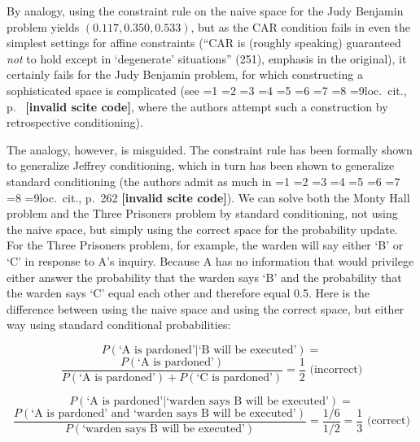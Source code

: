 \documentclass[12pt]{article}
\newcommand{\qnull}[1]{`#1'}
\newcommand{\qeins}[1]{``#1''}
\newcommand{\qzwei}[1]{`#1'}
\newif\ifNumericalOrYear
\newcommand{\PageP}{p.~}
\newcommand{\PageP}{}
\newcommand{\scite}[3]{\ifnum#1=1\ifNumericalOrYear\citep{#2}\else\citeyearpar{#2}\fi\else
\ifnum#1=2\ifNumericalOrYear\citep[#3]{#2}\else\citep[{\PageP}#3]{#2}\fi\else
\ifnum#1=3\ifNumericalOrYear(\citet[#3]{#2})\else\citep[{\PageP}#3]{#2}\fi\else
\ifnum#1=4\ifNumericalOrYear\citet{#2}\else\citet{#2}\fi\else
\ifnum#1=5\ifNumericalOrYear(\citet{#2})\else\citep{#2}\fi\else
\ifnum#1=6\ifNumericalOrYear(\citet[#3]{#2})\else\citep[{\PageP}#3]{#2}\fi\else
\ifnum#1=7\ifNumericalOrYear\citep{#2}\else\citealp{#2}\fi\else
\ifnum#1=8\ifNumericalOrYear\citep[#3]{#2}\else\citealp[{\PageP}#3]{#2}\fi\else
\ifnum#1=9\ifNumericalOrYear\citep[#3]{#2}\else{}loc.\ cit., {\PageP}#3\fi\else
\textbf{[invalid scite code]}\fi\fi\fi\fi\fi\fi\fi\fi\fi}
\begin{document}
By analogy, using the constraint rule on the naive space for the Judy
Benjamin problem yields $(0.117,0.350,0.533)$, but as the CAR
condition fails in even the simplest settings for affine constraints
(\qeins{CAR is (roughly speaking) guaranteed \emph{not} to hold except
  in \qzwei{degenerate} situations} (251), emphasis in the original),
it certainly fails for the Judy Benjamin problem, for which
constructing a sophisticated space is complicated (see
\scite{7}{grovehalpern97}{}, where the authors attempt such a
construction by retrospective conditioning).

The analogy, however, is misguided. The constraint rule has been
formally shown to generalize Jeffrey conditioning, which in turn has
been shown to generalize standard conditioning (the authors admit as
much in \scite{8}{gruenwaldhalpern03}{262}). We can solve both the
Monty Hall problem and the Three Prisoners problem by standard
conditioning, not using the naive space, but simply using the correct
space for the probability update. For the Three Prisoners problem, for
example, the warden will say either \qnull{B} or \qnull{C} in response
to A's inquiry. Because A has no information that would privilege
either answer the probability that the warden says \qnull{B} and the
probability that the warden says \qnull{C} equal each other and
therefore equal 0.5. Here is the difference between using the naive
space and using the correct space, but either way using standard
conditional probabilities:

\begin{displaymath}
  P(\mbox{`A is pardoned'}|\mbox{`B will be
    executed'})=
\end{displaymath}
\begin{displaymath}
  \frac{P(\mbox{`A is pardoned'})}{P(\mbox{`A is
      pardoned'})+P(\mbox{`C is pardoned'})}=\frac{1}{2}\mbox{ (incorrect)}
\end{displaymath}

\begin{displaymath}
  P(\mbox{`A is pardoned'}|\mbox{`warden says B will be
    executed'})=
\end{displaymath}
\begin{displaymath}
  \frac{P(\mbox{`A is pardoned' and `warden says B will
      be executed'})}{P(\mbox{`warden says B will be
      executed'})}=\frac{1/6}{1/2}=\frac{1}{3}\mbox{ (correct)}
\end{displaymath}
\end{document}
